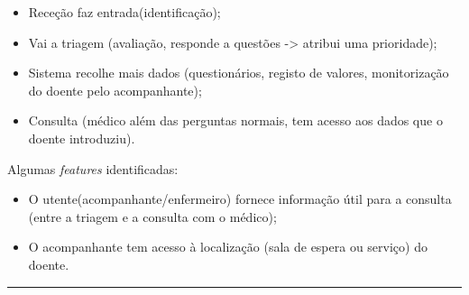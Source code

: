 \begin{itemize}
	\item Receção faz entrada(identificação);
	\item Vai a triagem (avaliação, responde a questões -> atribui uma prioridade);
	\item Sistema recolhe mais dados (questionários, registo de valores, monitorização do doente pelo acompanhante);
	\item Consulta (médico além das perguntas normais, tem acesso aos dados que o doente introduziu).
\end{itemize}

Algumas \textit{features} identificadas:
\begin{itemize}
	\item O utente(acompanhante/enfermeiro) fornece informação útil para a consulta (entre a triagem e a consulta com o médico);
	\item O acompanhante tem acesso à localização (sala de espera ou serviço) do doente.
\end{itemize}

\noindent \rule{\linewidth}{0.4pt}
\newline
